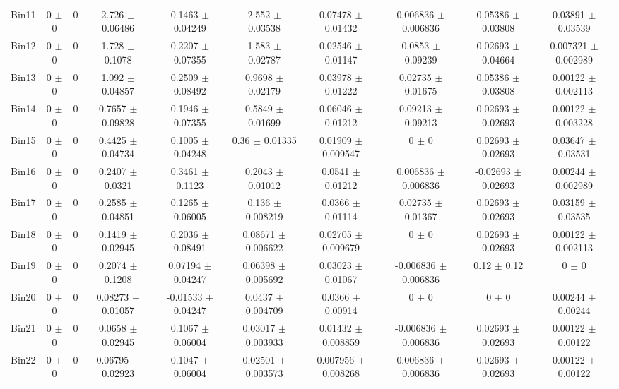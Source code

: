 \begin{tabular}{@{\extracolsep{4pt}}lccccccccc@{}}
     Bin11 & 0 $\pm$ 0 & 0 & 2.726 $\pm$ 0.06486 & 0.1463 $\pm$ 0.04249 & 2.552 $\pm$ 0.03538 & 0.07478 $\pm$ 0.01432 & 0.006836 $\pm$ 0.006836 & 0.05386 $\pm$ 0.03808 & 0.03891 $\pm$ 0.03539 \\ 
     Bin12 & 0 $\pm$ 0 & 0 & 1.728 $\pm$ 0.1078 & 0.2207 $\pm$ 0.07355 & 1.583 $\pm$ 0.02787 & 0.02546 $\pm$ 0.01147 & 0.0853 $\pm$ 0.09239 & 0.02693 $\pm$ 0.04664 & 0.007321 $\pm$ 0.002989 \\ 
     Bin13 & 0 $\pm$ 0 & 0 & 1.092 $\pm$ 0.04857 & 0.2509 $\pm$ 0.08492 & 0.9698 $\pm$ 0.02179 & 0.03978 $\pm$ 0.01222 & 0.02735 $\pm$ 0.01675 & 0.05386 $\pm$ 0.03808 & 0.00122 $\pm$ 0.002113 \\ 
     Bin14 & 0 $\pm$ 0 & 0 & 0.7657 $\pm$ 0.09828 & 0.1946 $\pm$ 0.07355 & 0.5849 $\pm$ 0.01699 & 0.06046 $\pm$ 0.01212 & 0.09213 $\pm$ 0.09213 & 0.02693 $\pm$ 0.02693 & 0.00122 $\pm$ 0.003228 \\ 
     Bin15 & 0 $\pm$ 0 & 0 & 0.4425 $\pm$ 0.04734 & 0.1005 $\pm$ 0.04248 & 0.36 $\pm$ 0.01335 & 0.01909 $\pm$ 0.009547 & 0 $\pm$ 0 & 0.02693 $\pm$ 0.02693 & 0.03647 $\pm$ 0.03531 \\ 
     Bin16 & 0 $\pm$ 0 & 0 & 0.2407 $\pm$ 0.0321 & 0.3461 $\pm$ 0.1123 & 0.2043 $\pm$ 0.01012 & 0.0541 $\pm$ 0.01212 & 0.006836 $\pm$ 0.006836 & -0.02693 $\pm$ 0.02693 & 0.00244 $\pm$ 0.002989 \\ 
     Bin17 & 0 $\pm$ 0 & 0 & 0.2585 $\pm$ 0.04851 & 0.1265 $\pm$ 0.06005 & 0.136 $\pm$ 0.008219 & 0.0366 $\pm$ 0.01114 & 0.02735 $\pm$ 0.01367 & 0.02693 $\pm$ 0.02693 & 0.03159 $\pm$ 0.03535 \\ 
     Bin18 & 0 $\pm$ 0 & 0 & 0.1419 $\pm$ 0.02945 & 0.2036 $\pm$ 0.08491 & 0.08671 $\pm$ 0.006622 & 0.02705 $\pm$ 0.009679 & 0 $\pm$ 0 & 0.02693 $\pm$ 0.02693 & 0.00122 $\pm$ 0.002113 \\ 
     Bin19 & 0 $\pm$ 0 & 0 & 0.2074 $\pm$ 0.1208 & 0.07194 $\pm$ 0.04247 & 0.06398 $\pm$ 0.005692 & 0.03023 $\pm$ 0.01067 & -0.006836 $\pm$ 0.006836 & 0.12 $\pm$ 0.12 & 0 $\pm$ 0 \\ 
     Bin20 & 0 $\pm$ 0 & 0 & 0.08273 $\pm$ 0.01057 & -0.01533 $\pm$ 0.04247 & 0.0437 $\pm$ 0.004709 & 0.0366 $\pm$ 0.00914 & 0 $\pm$ 0 & 0 $\pm$ 0 & 0.00244 $\pm$ 0.00244 \\ 
     Bin21 & 0 $\pm$ 0 & 0 & 0.0658 $\pm$ 0.02945 & 0.1067 $\pm$ 0.06004 & 0.03017 $\pm$ 0.003933 & 0.01432 $\pm$ 0.008859 & -0.006836 $\pm$ 0.006836 & 0.02693 $\pm$ 0.02693 & 0.00122 $\pm$ 0.00122 \\ 
     Bin22 & 0 $\pm$ 0 & 0 & 0.06795 $\pm$ 0.02923 & 0.1047 $\pm$ 0.06004 & 0.02501 $\pm$ 0.003573 & 0.007956 $\pm$ 0.008268 & 0.006836 $\pm$ 0.006836 & 0.02693 $\pm$ 0.02693 & 0.00122 $\pm$ 0.00122 \\ 

\end{tabular}
